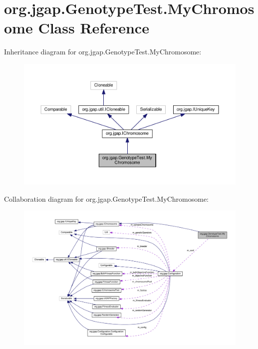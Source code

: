 \hypertarget{classorg_1_1jgap_1_1_genotype_test_1_1_my_chromosome}{\section{org.\-jgap.\-Genotype\-Test.\-My\-Chromosome Class Reference}
\label{classorg_1_1jgap_1_1_genotype_test_1_1_my_chromosome}
}


Inheritance diagram for org.\-jgap.\-Genotype\-Test.\-My\-Chromosome\-:
\nopagebreak
\begin{figure}[H]
\begin{center}
\leavevmode
\includegraphics[width=350pt]{classorg_1_1jgap_1_1_genotype_test_1_1_my_chromosome__inherit__graph}
\end{center}
\end{figure}


Collaboration diagram for org.\-jgap.\-Genotype\-Test.\-My\-Chromosome\-:
\nopagebreak
\begin{figure}[H]
\begin{center}
\leavevmode
\includegraphics[width=350pt]{classorg_1_1jgap_1_1_genotype_test_1_1_my_chromosome__coll__graph}
\end{center}
\end{figure}
